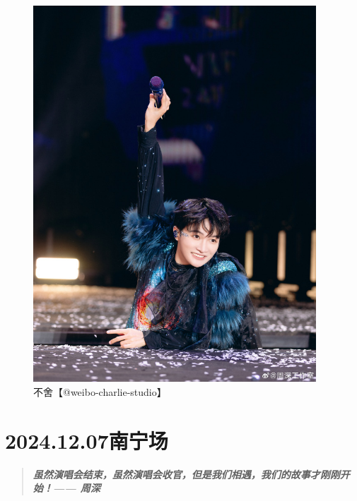 \documentclass[]{ctexbook}
\begin{document}
\begin{figure}

{\centering \includegraphics[width=300pt]{img/nanning20241206/006} 

}

\caption{不舍【@weibo-charlie-studio】}\label{fig:unnamed-chunk-158}
\end{figure}

\chapter{2024.12.07南宁场}\label{nanning-20241207}

\begin{quote}
\textbf{\emph{虽然演唱会结束，虽然演唱会收官，但是我们相遇，我们的故事才刚刚开始！------ 周深}}
\end{quote}
\end{document}
